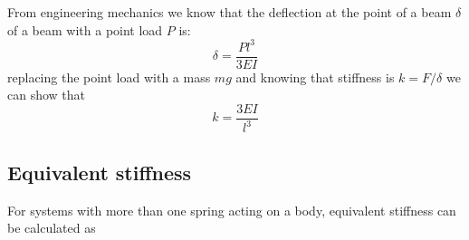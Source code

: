 \documentclass[12pt,a4paper]{article}
\begin{document}
			From engineering mechanics we know that the deflection at the point of a beam $\delta$ of a beam with a point load $P$ is:
			\begin{equation}
				\delta = \frac{Pl^3}{3EI}
			\end{equation}					
			replacing the point load with a mass $mg$ and knowing that stiffness is $k=F/\delta$ we can show that  
			\begin{equation}
				k = \frac{3EI}{l^3}
			\end{equation}		

		\subsection*{Equivalent stiffness}						
			
			For systems with more than one spring acting on a body, equivalent stiffness can be calculated as
\end{document}
